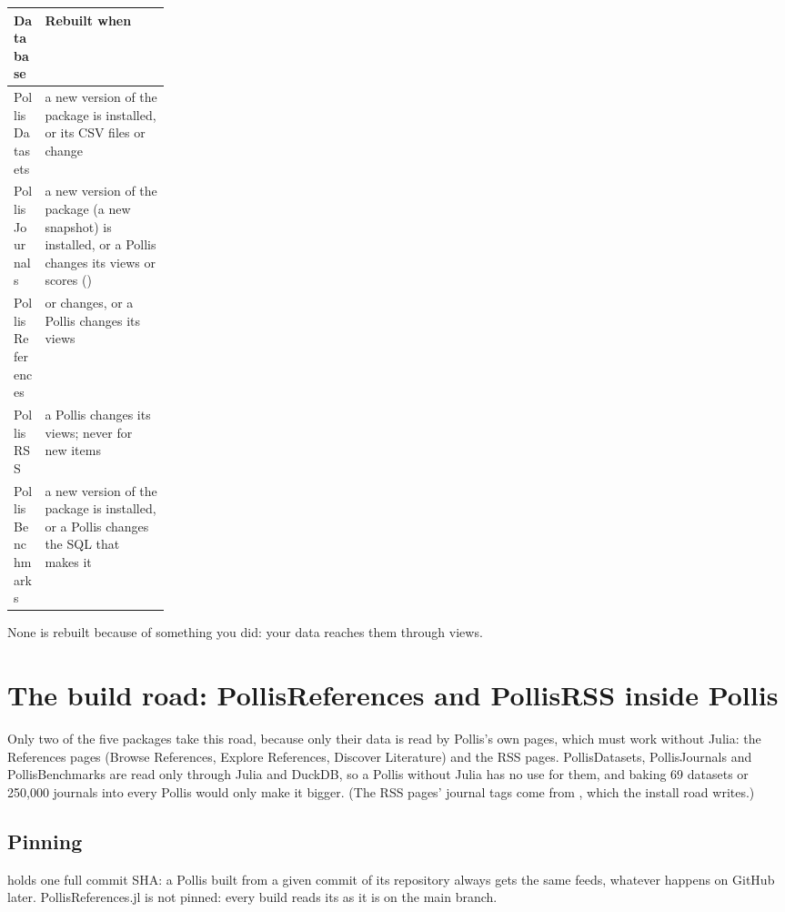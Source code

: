 \begin{center}\small
\renewcommand{\arraystretch}{1.2}
\begin{tabularx}{\linewidth}{@{}p{0.2\linewidth}L@{}}
\toprule
\textbf{Database} & \textbf{Rebuilt when}\\
\midrule
PollisDatasets & a new version of the package is installed, or its CSV files or  change\\
PollisJournals & a new version of the package (a new snapshot) is installed, or a Pollis changes its views or
  scores ()\\
PollisReferences &  or  changes, or a Pollis changes its views\\
PollisRSS & a Pollis changes its views; never for new items\\
PollisBenchmarks & a new version of the package is installed, or a Pollis changes the SQL that makes it\\
\bottomrule
\end{tabularx}
\end{center}
None is rebuilt because of something you did: your data reaches them through views.

\section{The build road: PollisReferences and PollisRSS inside Pollis}\label{sec:build}

Only two of the five packages take this road, because only their data is read by Pollis's own pages, which must work
without Julia: the References pages (Browse References, Explore References, Discover Literature) and the RSS pages.
PollisDatasets, PollisJournals and PollisBenchmarks are read only through Julia and DuckDB, so a Pollis without Julia
has no use for them,
and baking 69 datasets or 250,000 journals into every Pollis would only make it bigger. (The RSS pages' journal tags
come from , which the install road writes.)

\subsection{Pinning}
 holds one full commit SHA: a Pollis built from a given commit of its repository always
gets the same feeds, whatever happens on GitHub later. PollisReferences.jl is not pinned: every build reads its
 as it is on the main branch.

